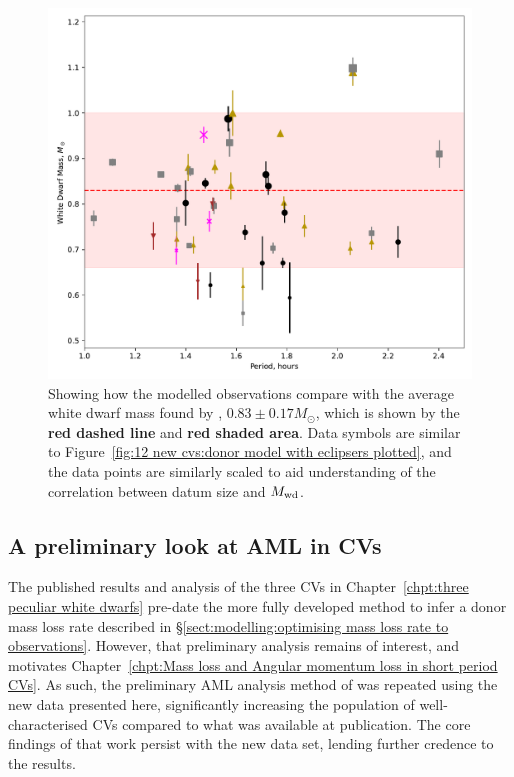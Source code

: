 \begin{figure}
    \centering
    \includegraphics[width=\textwidth]{figures/results/Modelled_Mwd_vs_Period.pdf}
    \caption{Showing how the modelled observations compare with the average white dwarf mass found by \citet{pala2020}, $0.83\pm0.17 M_\odot$, which is shown by the {\bf red dashed line} and {\bf red shaded area}. Data symbols are similar to Figure~\ref{fig:12 new cvs:donor model with eclipsers plotted}, and the data points are similarly scaled to aid understanding of the correlation between datum size and $M_{\rm wd}$.}
    \label{fig:12 new cvs:white dwarf masses vs period}
\end{figure}



\subsection{A preliminary look at AML in CVs}
\label{sect:12 new cvs:period excess}

The published results and analysis of the three CVs in Chapter~\ref{chpt:three peculiar white dwarfs} \citep{wild2021} pre-date the more fully developed method to infer a donor mass loss rate described in \S\ref{sect:modelling:optimising mass loss rate to observations}. However, that preliminary analysis remains of interest, and motivates Chapter~\ref{chpt:Mass loss and Angular momentum loss in short period CVs}.
As such, the preliminary AML analysis method of \citet{wild2021} was repeated using the new data presented here, significantly increasing the population of well-characterised CVs compared to what was available at publication. The core findings of that work persist with the new data set, lending further credence to the results.

